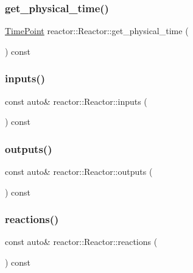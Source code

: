 \subsubsection{\texorpdfstring{get\+\_\+physical\+\_\+time()}{get\_physical\_time()}}
{\footnotesize\ttfamily \hyperlink{namespacereactor_ad950f8d1a46612500286a4af0f167080}{Time\+Point} reactor\+::\+Reactor\+::get\+\_\+physical\+\_\+time (\begin{DoxyParamCaption}{ }\end{DoxyParamCaption}) const}

\mbox{\label{classreactor_1_1Reactor_a9907a15d57a068a9785f1f5e74d0802a}} 
\subsubsection{\texorpdfstring{inputs()}{inputs()}}
{\footnotesize\ttfamily const auto\& reactor\+::\+Reactor\+::inputs (\begin{DoxyParamCaption}{ }\end{DoxyParamCaption}) const\hspace{0.3cm}{\ttfamily [inline]}}

\mbox{\label{classreactor_1_1Reactor_a6ee91ecde81bbffbb04773f1ae9b97dd}} 
\subsubsection{\texorpdfstring{outputs()}{outputs()}}
{\footnotesize\ttfamily const auto\& reactor\+::\+Reactor\+::outputs (\begin{DoxyParamCaption}{ }\end{DoxyParamCaption}) const\hspace{0.3cm}{\ttfamily [inline]}}

\mbox{\label{classreactor_1_1Reactor_a8667762f07039e52bfa7925a2a0fefc4}} 
\subsubsection{\texorpdfstring{reactions()}{reactions()}}
{\footnotesize\ttfamily const auto\& reactor\+::\+Reactor\+::reactions (\begin{DoxyParamCaption}{ }\end{DoxyParamCaption}) const\hspace{0.3cm}{\ttfamily [inline]}}

